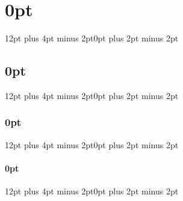 \titlespacing\chapter{0pt}{12pt plus 4pt minus 2pt}{0pt plus 2pt minus 2pt}
\titlespacing\section{0pt}{12pt plus 4pt minus 2pt}{0pt plus 2pt minus 2pt}
\titlespacing\subsection{0pt}{12pt plus 4pt minus 2pt}{0pt plus 2pt minus 2pt}
\titlespacing\subsubsection{0pt}{12pt plus 4pt minus 2pt}{0pt plus 2pt minus 2pt}